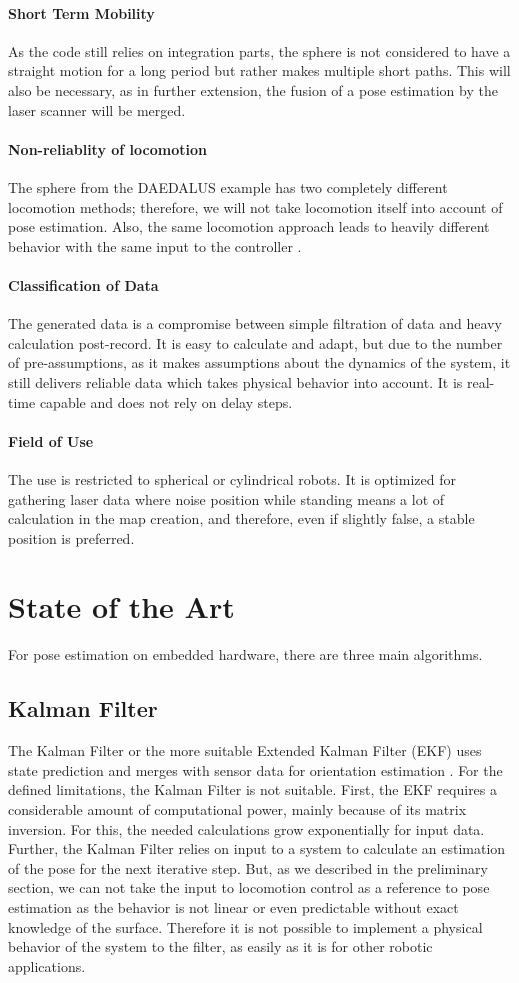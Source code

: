 \documentclass[letterpaper, 10 pt, conference]{ieeeconf}  %
\begin{document}
\paragraph*{Short Term Mobility}
As the code still relies on integration parts, the sphere is not considered to have a straight motion for a long period but rather makes multiple short paths. This will also be necessary, as in further extension, the fusion of a pose estimation by the laser scanner will be merged. 
\paragraph*{Non-reliablity of locomotion}
The sphere from the DAEDALUS example has two completely different locomotion methods; therefore, we will not take locomotion itself into account of pose estimation. Also, the same locomotion approach leads to heavily different behavior with the same input to the controller \cite{rossi2021daedalus}.
\paragraph*{Classification of Data}
The generated data is a compromise between simple filtration of data and heavy calculation post-record. It is easy to calculate and adapt, but due to the number of pre-assumptions, as it makes assumptions about the dynamics of the system, it still delivers reliable data which takes physical behavior into account. It is real-time capable and does not rely on delay steps.
\paragraph*{Field of Use}
The use is restricted to spherical or cylindrical robots. It is optimized for gathering laser data where noise position while standing means a lot of calculation in the map creation, and therefore, even if slightly false, a stable position is preferred.


\section{State of the Art}
\label{sec:SOA}
For pose estimation on embedded hardware, there are three main algorithms.
\subsection{Kalman Filter}
The Kalman Filter or the more suitable Extended Kalman Filter (EKF) uses state prediction and merges with sensor data for orientation estimation \cite{Kalman1960}.
For the defined limitations, the Kalman Filter is not suitable.
First, the EKF requires a considerable amount of computational power, mainly because of its matrix inversion. For this, the needed calculations grow exponentially for input data.
Further, the Kalman Filter relies on input to a system to calculate an estimation of the pose for the next iterative step.
But, as we described in the preliminary section, we can not take the input to locomotion control as a reference to pose estimation as the behavior is not linear or even predictable without exact knowledge of the surface.
Therefore it is not possible to implement a physical behavior of the system to the filter, as easily as it is for other robotic applications.
\end{document}
